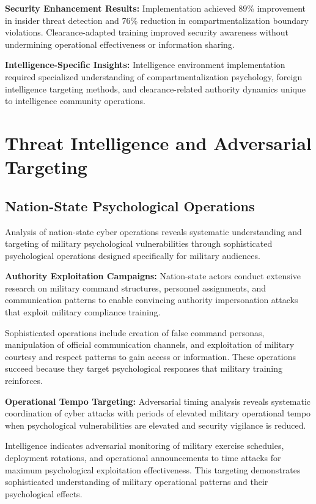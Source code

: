 \documentclass[10pt, twocolumn]{article}
\begin{document}
\textbf{Security Enhancement Results:} Implementation achieved 89\% improvement in insider threat detection and 76\% reduction in compartmentalization boundary violations. Clearance-adapted training improved security awareness without undermining operational effectiveness or information sharing.

\textbf{Intelligence-Specific Insights:} Intelligence environment implementation required specialized understanding of compartmentalization psychology, foreign intelligence targeting methods, and clearance-related authority dynamics unique to intelligence community operations.

\section{Threat Intelligence and Adversarial Targeting}

\subsection{Nation-State Psychological Operations}

Analysis of nation-state cyber operations reveals systematic understanding and targeting of military psychological vulnerabilities through sophisticated psychological operations designed specifically for military audiences.

\textbf{Authority Exploitation Campaigns:} Nation-state actors conduct extensive research on military command structures, personnel assignments, and communication patterns to enable convincing authority impersonation attacks that exploit military compliance training.

Sophisticated operations include creation of false command personas, manipulation of official communication channels, and exploitation of military courtesy and respect patterns to gain access or information. These operations succeed because they target psychological responses that military training reinforces.

\textbf{Operational Tempo Targeting:} Adversarial timing analysis reveals systematic coordination of cyber attacks with periods of elevated military operational tempo when psychological vulnerabilities are elevated and security vigilance is reduced.

Intelligence indicates adversarial monitoring of military exercise schedules, deployment rotations, and operational announcements to time attacks for maximum psychological exploitation effectiveness. This targeting demonstrates sophisticated understanding of military operational patterns and their psychological effects.
\end{document}
